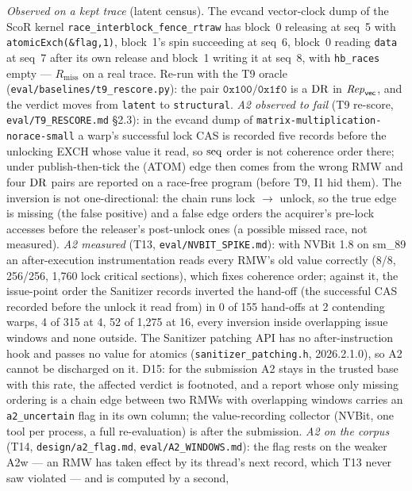 \documentclass[11pt]{article}
\theoremstyle{remark}
\newcommand{\cls}[1]{\texttt{#1}}\newcommand{\M}{\mathsf{M}}
\begin{document}
\noindent\emph{Observed on a kept trace} (latent census). The evcand vector-clock dump of
the ScoR kernel \texttt{race\_interblock\_fence\_rtraw} has block~0 releasing at seq~5
with \texttt{atomicExch(\&flag,1)}, block~1's spin succeeding at seq~6, block~0 reading
\texttt{data} at seq~7 after its own release and block~1 writing it at seq~8, with
\texttt{hb\_races} empty --- $R_{\mathrm{miss}}$ on a real trace. Re-run with the T9
oracle (\texttt{eval/baselines/t9\_rescore.py}): the pair $\mathtt{0x100}/\mathtt{0x1f0}$ is a
$\operatorname{DR}$ in $\mathit{Rep}_{\mathsf{vec}}$, and the verdict moves from \cls{latent} to \cls{structural}.
\emph{A2 observed to fail} (T9 re-score, \texttt{eval/T9\_RESCORE.md} \S2.3): in the evcand dump
of \texttt{matrix-multiplication-norace-small} a warp's successful lock CAS is recorded
five records before the unlocking EXCH whose value it read, so $\operatorname{seq}$ order is not coherence
order there; under publish-then-tick the (ATOM) edge then comes from the wrong RMW and
four $\operatorname{DR}$ pairs are reported on a race-free program (before T9, I1 hid them). The
inversion is not one-directional: the chain runs lock $\to$ unlock, so the true edge is
missing (the false positive) and a false edge orders the acquirer's pre-lock accesses
before the releaser's post-unlock ones (a possible missed race, not measured). \emph{A2
measured} (T13, \texttt{eval/NVBIT\_SPIKE.md}): with NVBit 1.8 on sm\_89 an after-execution
instrumentation reads every RMW's old value correctly (8/8, 256/256, 1,760 lock critical
sections), which fixes coherence order; against it, the issue-point order the Sanitizer
records inverted the hand-off (the successful CAS recorded before the unlock it read
from) in 0 of 155 hand-offs at 2 contending warps, 4 of 315 at 4, 52 of 1,275 at 16,
every inversion inside overlapping issue windows and none outside. The Sanitizer patching
API has no after-instruction hook and passes no value for atomics
(\texttt{sanitizer\_patching.h}, 2026.2.1.0), so A2 cannot be discharged on it. D15: for
the submission A2 stays in the trusted base with this rate, the affected verdict is
footnoted, and a report whose only missing ordering is a chain edge between two RMWs
with overlapping windows carries an \texttt{a2\_uncertain} flag in its own column; the
value-recording collector (NVBit, one tool per process, a full re-evaluation) is after
the submission. \emph{A2 on the corpus} (T14, \texttt{design/a2\_flag.md},
\texttt{eval/A2\_WINDOWS.md}): the flag rests on the weaker A2w --- an RMW has taken effect by
its thread's next record, which T13 never saw violated --- and is computed by a second,
\end{document}
